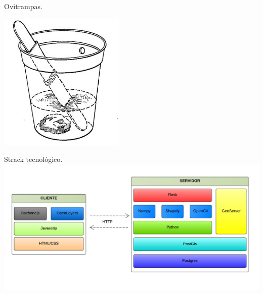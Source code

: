 \begin{frame}[c]{Ovitrampas.}
  \begin{center}
    \includegraphics[width=6cm]{../book/capitulo-3/graphics/ovitrampa.jpg}
  \end{center}
\end{frame}

\begin{frame}[c]{Strack tecnológico.}
\includegraphics[width=\textwidth]{../book/capitulo-5/graphics/stack-tecnologias.png}
\end{frame}


